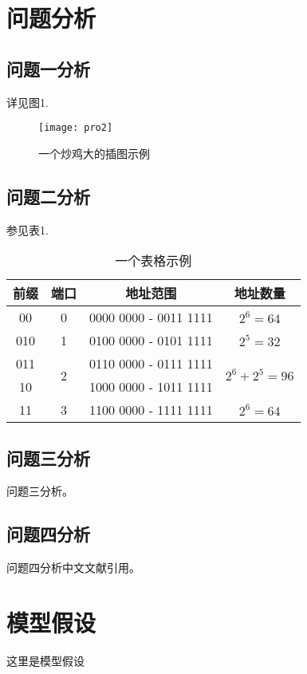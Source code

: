 \documentclass{cumcmthesis}
\begin{document}
\section{问题分析}
\subsection{问题一分析}
详见图1.
\begin{figure}[htbp]
    \centering
    \texttt{[image: pro2]}
    \caption{一个炒鸡大的插图示例}
\end{figure}
\subsection{问题二分析}
参见表1.
\begin{table}[htbp]
    \centering
    \begin{tabular}{cccc}
        \toprule
        前缀 & 端口               & 地址范围              & 地址数量                          \\
        \midrule
        00   & 0                  & 0000 0000 - 0011 1111 & $2^6 = 64$                        \\
        010  & 1                  & 0100 0000 - 0101 1111 & $2^5 = 32$                        \\
        011  & \multirow{2}{*}{2} & 0110 0000 - 0111 1111 & \multirow{2}{*}{$2^6 + 2^5 = 96$} \\
        10   & ~                  & 1000 0000 - 1011 1111 & ~                                 \\
        11   & 3                  & 1100 0000 - 1111 1111 & $2^6 = 64$                        \\
        \bottomrule
    \end{tabular}
    \caption{一个表格示例}
\end{table}
\subsection{问题三分析}
问题三分析。
\subsection{问题四分析}
问题四分析中文文献引用。
\section{模型假设}
这里是模型假设
\end{document}
